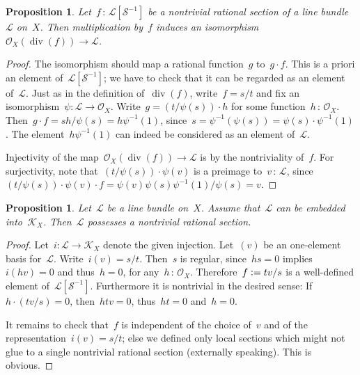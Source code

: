 \documentclass[10pt]{amsart}
\theoremstyle{definition}
\theoremstyle{plain}
\newtheorem{prop}[defn]{Proposition}
\theoremstyle{remark}
\renewcommand{\O}{\mathcal{O}}
\newcommand{\K}{\mathcal{K}}
\renewcommand{\L}{\mathcal{L}}
\renewcommand{\S}{\mathcal{S}}
\newcommand{\?}{\,{:}\,}
\renewcommand{\_}{\mathpunct{.}\,}
\newcommand{\defeq}{\vcentcolon=}
\begin{document}
\begin{prop}Let~$f\?\L[\S^{-1}]$ be a nontrivial rational section of a line
bundle~$\L$ on~$X$. Then multiplication by~$f$ induces an
isomorphism~$\O_X(\operatorname{div}(f)) \to \L$.\end{prop}
\begin{proof}The isomorphism should map a rational function~$g$ to~$g \cdot f$. This
is a priori an element of~$\L[\S^{-1}]$; we have to check that it can be
regarded as an element of~$\L$. Just as in the definition
of~$\operatorname{div}(f)$, write~$f = s/t$ and fix an isomorphism~$\psi : \L
\to \O_X$. Write~$g = (t/\psi(s)) \cdot h$ for some function~$h\?\O_X$. Then~$g
\cdot f = sh/\psi(s) = h\psi^{-1}(1)$, since~$s = \psi^{-1}(\psi(s)) = \psi(s)
\cdot \psi^{-1}(1)$. The element~$h\psi^{-1}(1)$ can indeed be considered as an
element of~$\L$.

Injectivity of the map~$\O_X(\operatorname{div}(f)) \to \L$ is by the
nontriviality of~$f$. For surjectivity, note that~$(t/\psi(s)) \cdot \psi(v)$ is a
preimage to~$v\?\L$, since~$(t/\psi(s)) \cdot \psi(v) \cdot f = \psi(v) \psi(s)
\psi^{-1}(1) / \psi(s) = v$.
\end{proof}

\begin{prop}Let~$\L$ be a line bundle on~$X$. Assume that~$\L$ can be embedded
into~$\K_X$. Then~$\L$ possesses a nontrivial rational section.
\end{prop}
\begin{proof}Let~$i : \L \to \K_X$ denote the given injection. Let~$(v)$ be an
one-element basis for~$\L$. Write~$i(v) = s/t$. Then~$s$ is regular,
since~$hs = 0$ implies~$i(hv) = 0$ and thus~$h = 0$, for any~$h\?\O_X$.
Therefore~$f \defeq tv/s$ is a well-defined element of~$\L[\S^{-1}]$.
Furthermore it is nontrivial in the desired sense: If~$h \cdot (tv/s) = 0$,
then~$htv = 0$, thus~$ht = 0$ and~$h = 0$.

It remains to check that~$f$ is independent of the choice of~$v$ and of the
representation~$i(v) = s/t$; else we defined only local sections which might not
glue to a single nontrivial rational section (externally speaking). This is
obvious.
\end{proof}
\end{document}
